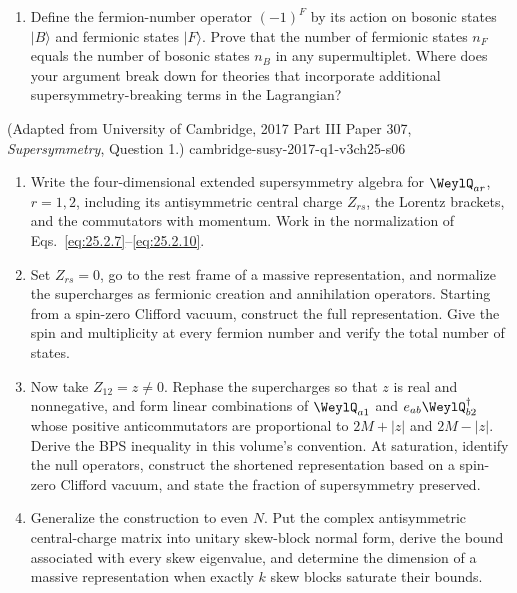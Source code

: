 \begin{enumerate}
\begin{enumerate}
\[\begin{aligned}
        \widehat{\mathsf P}\overline Q^{\dot a}
          \widehat{\mathsf P}^{-1}
          &=-\eta_{\mathsf P}^{*}
            (\bar s^0)^{\dot a b}Q_b .
      \end{aligned}
      \]
      By performing a parity transformation on each side of the algebra
      between \(Q_a\) and \(\overline Q_{\dot b}\) that you derived in
      part (b), check that the relation is consistent with a parity
      transformation.
    \item Define the fermion-number operator \((-1)^F\) by its action on
      bosonic states \(\lvert B\rangle\) and fermionic states
      \(\lvert F\rangle\).  Prove that the number of fermionic states
      \(n_F\) equals the number of bosonic states \(n_B\) in any
      supermultiplet.  Where does your argument break down for theories
      that incorporate additional supersymmetry-breaking terms in the
      Lagrangian?
  \end{enumerate}

    {(Adapted from University of Cambridge, 2017 Part III Paper 307, \emph{Supersymmetry}, Question 1.)}
    {cambridge-susy-2017-q1-v3ch25-s06}
  \begin{enumerate}
    \item Write the four-dimensional extended supersymmetry algebra for
      \(\WeylQ_{ar}\), \(r=1,2\), including its antisymmetric central charge
      \(Z_{rs}\), the Lorentz brackets, and the commutators with momentum.
      Work in the normalization of Eqs.~\eqref{eq:25.2.7}--\eqref{eq:25.2.10}.
    \item Set \(Z_{rs}=0\), go to the rest frame of a massive representation,
      and normalize the supercharges as fermionic creation and annihilation
      operators.  Starting from a spin-zero Clifford vacuum, construct the
      full representation.  Give the spin and multiplicity at every fermion
      number and verify the total number of states.
    \item Now take \(Z_{12}=z\ne0\).  Rephase the supercharges so that \(z\)
      is real and nonnegative, and form linear combinations of
      \(\WeylQ_{a1}\) and \(e_{ab}\WeylQ_{b2}^\dagger\) whose positive
      anticommutators are proportional to \(2M+|z|\) and \(2M-|z|\).
      Derive the BPS inequality in this volume's convention.  At saturation,
      identify the null operators, construct the shortened representation
      based on a spin-zero Clifford vacuum, and state the fraction of
      supersymmetry preserved.
    \item Generalize the construction to even \(N\).  Put the complex
      antisymmetric central-charge matrix into unitary skew-block normal form,
      derive the bound associated with every skew eigenvalue, and determine
      the dimension of a massive representation when exactly \(k\) skew
      blocks saturate their bounds.
  \end{enumerate}


\end{enumerate}
